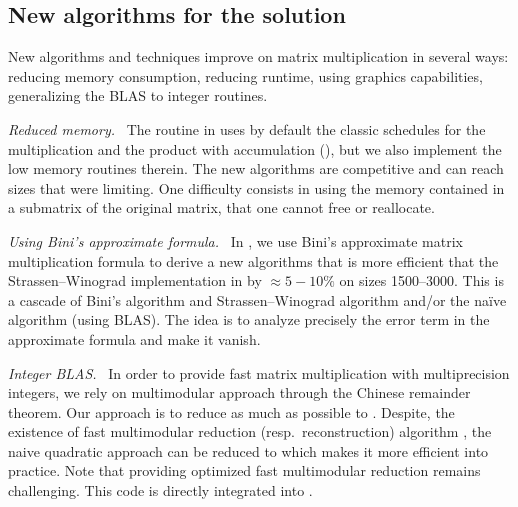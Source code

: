 \subsection{New algorithms for the \mul solution}\label{ssec:algmul}
%
New algorithms and techniques improve on matrix multiplication
in several  ways: reducing memory consumption, reducing runtime, 
using graphics capabilities, generalizing the BLAS to integer
routines.
%
\def\monitem#1{\par \textit{#1}\ }
\monitem{Reduced memory.}
%
The routine \fgemm in \fflas uses by default the classic schedules for the multiplication
and the product with accumulation (\cf \cite{Boyer:2009:sched}), but we also
implement the low memory routines therein. The new algorithms are competitive
and can reach sizes that were limiting.
%
%
One difficulty consists in using the memory contained in a submatrix of
the original matrix, that one cannot free or reallocate.
%
\monitem{Using Bini's approximate formula.}
%
In \cite{BD:2014:Bini}, we use Bini's approximate matrix multiplication formula
to derive a new algorithms that is more efficient that the Strassen--Winograd
implementation in \fgemm by $\approx 5-10\%$ on sizes \num{1500}--\num{3000}.
This is a cascade of Bini's algorithm and Strassen--Winograd algorithm and/or
the naïve algorithm (using BLAS). The idea is to analyze precisely the error
term in the approximate formula and make it vanish.
%
\monitem{Integer BLAS.}
%
In order to provide fast matrix multiplication with multiprecision integers, we
rely on multimodular approach through the Chinese remainder theorem. Our
approach is to reduce as much as possible to \fgemm. Despite, the existence of
fast multimodular reduction (resp.\ reconstruction) algorithm
\cite{VonzurGathen:1999:MCA}, the naive quadratic approach can be reduced to
\fgemm which makes it more efficient into practice.  Note that providing
optimized fast multimodular reduction remains challenging. This code is
directly integrated  into \fflas.

